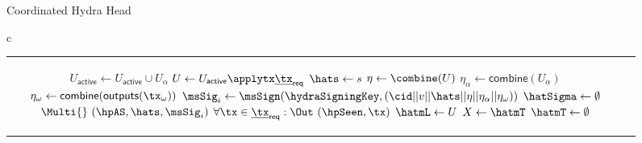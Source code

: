 \begin{figure*}[t!]
\begin{algobox}{Coordinated Hydra Head}
\begin{tabular}{c}
\begin{tabular}{c@{}c}
{\begin{walgo}{0.65}
{{{{{									  $U_{\mathsf{active}} \gets U_{\mathsf{active}} \cup  U_{\alpha}$ \;
									}
								  }
								}
								\Req{$U_{\mathsf{active}} \applytx \underline{\tx}_{\mathsf{req}} \not= \bot$} \;
								$U \gets U_{\mathsf{active}} \applytx \underline{\tx}_{\mathsf{req}}$ \;
								$\hats \gets s$ \;
								$\eta \gets \combine(U)$ \;
								$\eta_\alpha \gets \mathsf{combine}(U_\alpha)$ \;
								$\eta_\omega \gets \mathsf{combine}(\mathsf{outputs}(\tx_\omega))$ \;
								$\msSig_i \gets \msSign(\hydraSigningKey, (\cid || v || \hats || \eta || \eta_\alpha || \eta_\omega))$ \;
								$\hatSigma \gets \emptyset$ \;
								$\Multi{}~(\hpAS,\hats,\msSig_i)$ \;
								$\forall \tx \in \underline{\tx}_{\mathsf{req}}: \Out~(\hpSeen,\tx)$ \;
								$\hatmL \gets U$ \;
								$X\gets\hatmT$ \;
								$\hatmT\gets\emptyset$ \;
								\For{$\tx\in X : \hatmL\applytx \tx \not=\bot$}{
									$\hatmT\gets\hatmT\cup\{\tx\}$ \;
									$\hatmL\gets\hatmL\applytx \tx$ \;
								}
							}
						}
						\vspace{12pt}
					\end{walgo}
				} &

				\adjustbox{valign=t,scale=\sfact}{
					\begin{walgo}{0.7}
						\On{$(\hpAS,s,\msSig_j)$ from $\party_j$}{
							\Req{} $s \in \{\hats,\hats+1\}$ \;
							\Wait{$\hats=s$}{
								\Req{} $(j, \cdot) \notin \hatSigma$ \;
								$\hatSigma[j] \gets \sigma_{j}$ \;
								\If{$\forall k \in [1..n]: (k,\cdot) \in \hatSigma$}{
									$\msCSig \gets \msComb(\hydraKeys^{setup}, \hatSigma)$ \;

									$\eta \gets \combine(\hatmU)$ \;

									$\eta_\alpha \gets \mathsf{combine}(U_\alpha)$ \;
									$U_\omega \gets \mathsf{outputs}(\tx_\omega)$ \;
									$\eta_\omega \gets \mathsf{combine}(U_\omega)$ \;
									\Req{} $\msVfy(\hydraKeysAgg, (\cid || \hatv || \hats || \eta || \eta_\alpha || \eta_\omega), \msCSig)$ \;
									$\bar{\mc S} \gets \Sno(\hatv, \hats, \hatmT, \hatmU, U_\alpha, U_\omega)$ \;
									$\bar{\mc S}.\sigma \gets \msCSig$ \;
									$\forall \tx \in \mT_{\mathsf{req}} : \Out (\hpConf,\tx)$ \;

}}}
\end{walgo}}
\end{tabular}
\end{tabular}
\end{algobox}
\end{figure*}
